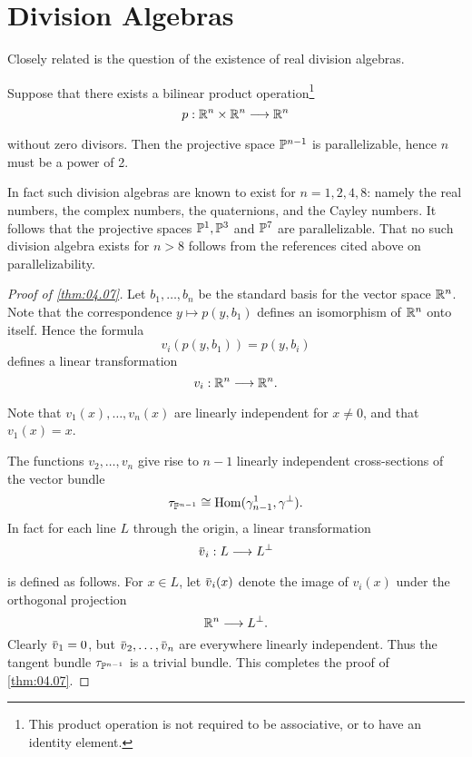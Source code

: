\documentclass[../main]{subfiles}
\begin{document}
\section{Division Algebras}\label{sec:4.2}

Closely related is the question of the existence of real division algebras.

\begin{theorem}[Stiefel]
\label{thm:04.07}
Suppose that there exists a bilinear
product operation\footnote{This product operation is not required to be associative, or to have an identity element.}
\[
p:\bR^n\times\bR^n\varrightarrow{}\bR^n
\]
without zero divisors. Then the projective space $\mathbb{P}^{n-1}$ is parallelizable, hence $n$ must be a power of 2.
\end{theorem}

In fact such division algebras are known to exist for $n =1, 2, 4, 8$: namely the real numbers, the complex numbers, the quaternions, and the Cayley numbers. It follows that the projective spaces $\mathbb{P}^{1}, \mathbb{P}^{3}$ and $\mathbb{P}^{7}$ are parallelizable. That no such division algebra exists for $n > 8$ follows from the references cited above on parallelizability.	

\begin{proof}[Proof of \ref{thm:04.07}]
Let $b_1,\dots, b_n$ be the standard basis for the vector space $\mathbb R^n$. Note that the correspondence $y\mapsto p(y,b_1)$ defines an isomorphism of $\mathbb R^n$ onto itself. Hence the formula 
\[
v_{i}(p(y, b_{1}))=p(y, b_{i})
\] 
defines a linear transformation 
\[
v_i:\bR^n\varrightarrow{}\bR^n.
\]
Note that $v_{1}(x), \dots, v_{n}(x)$ are linearly independent for $x\neq 0$, and that $v_1(x) = x$.

The functions $v_{2}, \dots, v_{n}$ give rise to $n-1$ linearly independent cross-sections of the vector bundle 
\[
\tau_{\mathbb{P}^{n-1}}\cong\operatorname{Hom}(\gamma^1_{n-1},\gamma^\perp).
\] 
In fact for each line $L$ through the origin, a linear transformation
\[
\xoverline{v}_{i}:{L}\varrightarrow{} L^{\perp}
\]
is defined as follows. For $x \in L$, let $\xoverline{v}_{i}(x)$ denote the image of $v_{i}(x)$ under the orthogonal projection 
\[
\mathbb R^{n} \longrightarrow L^{\perp}.
\]
Clearly $\xoverline{v}_{1}=0$, but $\xoverline{v}_{2}, \dots, \xoverline{v}_{n}$ are everywhere linearly independent. Thus the tangent bundle $\tau_{\mathbb{P}^{n-1}}$ is a trivial bundle. This completes the proof of \ref{thm:04.07}.
\end{proof}
\end{document}
